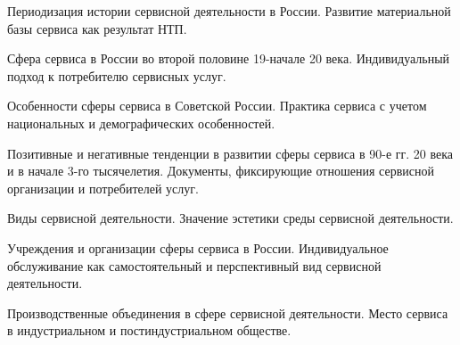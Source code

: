 \documentclass[
	14pt,
	a4paper,
	]
	{scrartcl}
\begin{document}
\vfill

\newpage


\shapk
{}
\setcounter{zad}{0}

\vfill
\z Периодизация истории сервисной деятельности в России.
 \vfill
\z Развитие материальной базы сервиса как результат НТП.
 \vfill

\vfill

\newpage


\shapk
{}
\setcounter{zad}{0}

\vfill
\z Сфера сервиса в России во второй половине 19-начале 20 века.
 \vfill
\z Индивидуальный подход к потребителю сервисных услуг.
 \vfill

\vfill

\newpage


\shapk
{}
\setcounter{zad}{0}

\vfill
\z Особенности сферы сервиса в Советской России.
 \vfill
\z Практика сервиса с учетом национальных и демографических особенностей.
 \vfill

\vfill

\newpage


\shapk
{}
\setcounter{zad}{0}

\vfill
\z Позитивные и негативные тенденции в развитии сферы сервиса в 90-е гг. 20 века и в начале 3-го тысячелетия.
 \vfill
\z Документы, фиксирующие отношения сервисной организации и потребителей услуг.
 \vfill

\vfill

\newpage


\shapk
{}
\setcounter{zad}{0}

\vfill
\z Виды сервисной деятельности.
 \vfill
\z Значение эстетики среды сервисной деятельности.
 \vfill

\vfill

\newpage


\shapk
{}
\setcounter{zad}{0}

\vfill
\z Учреждения и организации сферы сервиса в России.
 \vfill
\z Индивидуальное обслуживание как самостоятельный и перспективный вид сервисной деятельности.
 \vfill

\vfill

\newpage


\shapk
{}
\setcounter{zad}{0}

\vfill
\z Производственные объединения в сфере сервисной деятельности.
 \vfill
\z Место сервиса в индустриальном и постиндустриальном обществе.
 \vfill
\end{document}
